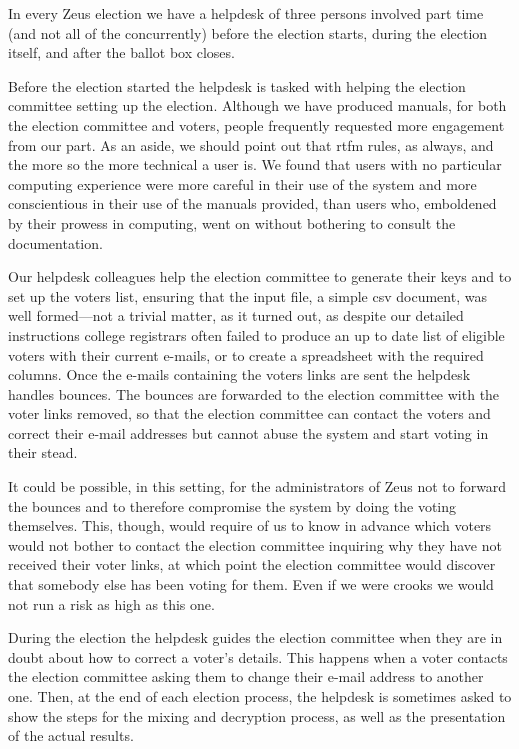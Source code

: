 \documentclass[letterpaper,10pt]{article}
\begin{document}
In every Zeus election we have a helpdesk of three persons involved
part time (and not all of the concurrently) before the election
starts, during the election itself, and after the ballot box closes.

Before the election started the helpdesk is tasked with helping the
election committee setting up the election. Although we have produced
manuals, for both the election committee and voters, people frequently
requested more engagement from our part. As an aside, we should point
out that {\sc rtfm} rules, as always, and the more so the more
technical a user is. We found that users with no particular computing
experience were more careful in their use of the system and more
conscientious in their use of the manuals provided, than users who,
emboldened by their prowess in computing, went on without bothering to
consult the documentation.

Our helpdesk colleagues help the election committee to generate
their keys and to set up the voters list, ensuring that the input
file, a simple {\sc csv} document, was well formed---not a trivial
matter, as it turned out, as despite our detailed instructions college
registrars often failed to produce an up to date list of eligible
voters with their current e-mails, or to create a spreadsheet with the
required columns. Once the e-mails containing the
voters links are sent the helpdesk handles bounces. The bounces
are forwarded to the election committee with the voter links removed,
so that the election committee can contact the voters and correct
their e-mail addresses but cannot abuse the system and start voting in
their stead. 

It could be possible, in this setting, for the administrators of Zeus
not to forward the bounces and to therefore compromise the system by
doing the voting themselves. This, though, would require of us to know
in advance which voters would not bother to contact the election
committee inquiring why they have not received their voter links, at
which point the election committee would discover that somebody else
has been voting for them. Even if we were crooks we would not run a
risk as high as this one.

During the election the helpdesk guides the election committee when
they are in doubt about how to correct a voter's details. This happens
when a voter contacts the election committee asking them to change
their e-mail address to another one. Then, at the end of each election
process, the helpdesk is sometimes asked to show the steps for the
mixing and decryption process, as well as the presentation of the
actual results.
\end{document}
